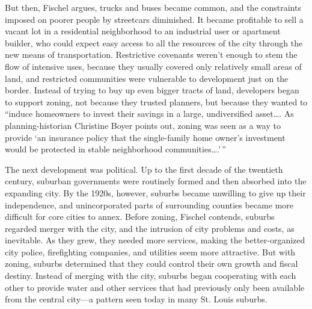 But then, Fischel argues, trucks and buses became common, and the constraints
imposed on poorer people by streetcars diminished. It became profitable to sell
a vacant lot in a residential neighborhood to an industrial user or apartment
builder, who could expect easy access to all the resources of the city through
the new means of transportation. Restrictive covenants weren't enough to stem
the flow of intensive uses, because they usually covered only relatively small
areas of land, and restricted communities were vulnerable to development just on
the border. Instead of trying to buy up even bigger tracts of land, developers
began to support zoning, not because they trusted planners, but because they
wanted to ``induce homeowners to invest their savings in a large, undiversified
asset\ldots . As planning-historian Christine Boyer points out, zoning was seen
as a way to provide `an insurance policy that the single-family home owner's
investment would be protected in stable neighborhood communities\ldots .'\,''

The next development was political. Up to the first decade of the twentieth
century, suburban governments were routinely formed and then absorbed into the
expanding city. By the 1920s, however, suburbs became unwilling to give up their
independence, and unincorporated parts of surrounding counties became more
difficult for core cities to annex. Before zoning, Fischel contends, suburbs
regarded merger with the city, and the intrusion of city problems and costs, as
inevitable. As they grew, they needed more services, making the better-organized
city police, firefighting companies, and utilities seem more attractive. But
with zoning, suburbs determined that they could control their own growth and
fiscal destiny. Instead of merging with the city, suburbs began cooperating with
each other to provide water and other services that had previously only been
available from the central city---a pattern seen today in many St. Louis
suburbs.

